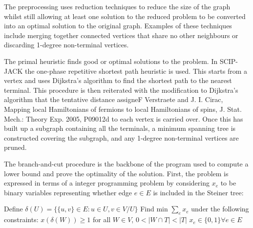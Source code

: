 \documentclass[pdftex,pra,aps,twocolumn,twoside]{revtex4-2}
\theoremstyle{plain}
\theoremstyle{note}
\newcommand\+{{\footnotesize \raisebox{0.3ex}{+}}}
\begin{document}
The preprocessing uses reduction techniques to reduce the size of the graph whilst still allowing at least one solution to the reduced problem to be converted into an optimal solution to the original graph. Examples of these techniques include merging together connected vertices that share no other neighbours or discarding 1-degree non-terminal vertices.

The primal heuristic finds good or optimal solutions to the problem. In SCIP-JACK the one-phase repetitive shortest path heuristic \cite{aragao2002implementation} is used. This starts from a vertex and uses Dijkstra’s algorithm \cite{dijkstra2022note} to find the shortest path to the nearest terminal. This procedure is then reiterated with the modification to Dijkstra’s algorithm that the tentative distance assigneF Verstraete and J. I. Cirac, Mapping local Hamiltonians of fermions
to local Hamiltonians of spins, J. Stat. Mech.: Theory Exp. 2005, P09012d to each vertex is carried over. Once this has built up a subgraph containing all the terminals, a minimum spanning tree is constructed covering the subgraph, and any 1-degree non-terminal vertices are pruned.

The branch-and-cut procedure is the backbone of the program used to compute a lower bound and prove the optimality of the solution. First, the problem is expressed in terms of a integer programming problem by considering $x_e$ to be binary variables representing whether edge $e \in E$ is included in the Steiner tree:

\begin{algorithm}
\centering
\caption*{\label{alg:steinerTreeCut}\textsc{Steiner Tree Problem Undirected Cut Formulation}}
\begin{minipage}{.4\linewidth}
\begin{algorithmic}[1]
\Statex Define $\delta (U) =\{\{u,v\} \in E: u \in U, v \in V/U \}$
\Statex
\Statex Find min $\sum_e x_e$ under the following constraints:
\State $x(\delta (W)) \geq 1$ for all $W \in V$, $0 < |W \cap T| < |T|$
\State $x_e \in \{0,1\} \forall e \in E$
\end{algorithmic}
\end{minipage}
\end{algorithm}
\end{document}
